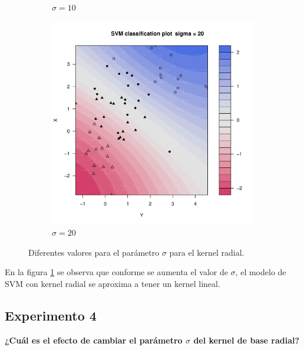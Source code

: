 \begin{figure}[H]
\begin{subfigure}{0.24\linewidth}
		\caption{$\sigma=10$}
	\end{subfigure}
	\begin{subfigure}{0.24\linewidth}
		\includegraphics[width=1\linewidth]{Graphics/Problema_01/Experiment_03_4.pdf}
		\caption{$\sigma=20$}
	\end{subfigure}
	\caption{Diferentes valores para el parámetro $\sigma$ para el kernel radial.}
	\label{fig:experimento_3}
\end{figure}

En la figura \ref{fig:experimento_3} se observa que conforme se aumenta el valor de $\sigma$, el modelo de SVM con kernel radial se aproxima a tener un kernel lineal.

\subsection*{Experimento 4}

\textbf{¿Cuál es el efecto de cambiar el parámetro $\sigma$ del kernel de base radial?}

